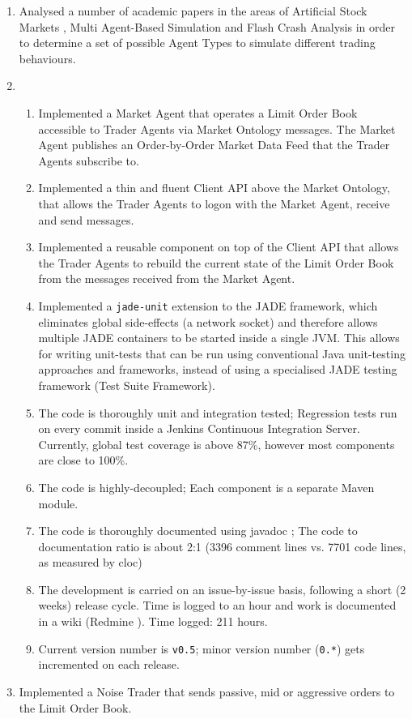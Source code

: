 \documentclass[10pt,a4paper]{article}
\begin{document}
\begin{enumerate}
\item Analysed a number of academic papers in the areas of Artificial Stock Markets \cite{Jha2010}, Multi Agent-Based Simulation \cite{Boer-Sorban2008} and Flash Crash Analysis \cite{kirilenko2011} in order to determine a set of possible Agent Types to simulate different trading behaviours.   

\item  
\begin{enumerate}
\item Implemented a Market Agent that operates a Limit Order Book accessible to Trader Agents via Market Ontology messages. The Market Agent publishes an Order-by-Order Market Data Feed that the Trader Agents subscribe to.
\item  Implemented a thin and fluent Client API above the Market Ontology, that allows the Trader Agents to logon with the Market Agent, receive and send messages.
\item Implemented a reusable component on top of the Client API that allows the Trader Agents to rebuild the current state of the Limit Order Book from the messages received from the Market Agent. 
\item Implemented a \texttt{jade-unit} extension to the JADE framework, which eliminates global side-effects (a network socket) and therefore allows multiple JADE containers to be started inside a single JVM. This allows for writing unit-tests that can be run using conventional Java unit-testing approaches and frameworks, instead of using a specialised JADE testing framework (Test Suite Framework\cite{jade}).
\item The code is thoroughly unit and integration tested; Regression tests run on every commit inside a Jenkins Continuous Integration Server\cite{jenkins}. Currently, global test coverage is above 87\%, however most components are close to 100\%.
\item The code is highly-decoupled; Each component is a separate Maven module\cite{maven}.
\item The code is thoroughly documented using javadoc \cite{javadoc}; The code to documentation ratio is about 2:1 (3396 comment lines vs. 7701 code lines, as measured by cloc\cite{cloc}) 
\item The development is carried on an issue-by-issue basis, following a short (2 weeks) release cycle. Time is logged to an hour and work is documented in a wiki (Redmine \cite{redmine}). Time logged: 211 hours. 
\item Current version number is \texttt{v0.5}; minor version number (\texttt{0.*}) gets incremented on each release.
\end{enumerate} 

\item Implemented a Noise Trader that sends passive, mid or aggressive orders to the Limit Order Book.  

\end{enumerate}
\end{document}
